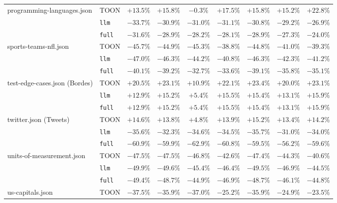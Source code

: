\begin{table}[t]
\begin{tabular}{@{}llccccccc@{}}
    \cline{2-9}
    \multirow{3}{*}{programming-languages.json} & TOON & $+13.5\%$ & $+15.8\%$ & $-0.3\%$ & $+17.5\%$ & $+15.8\%$ & $+15.2\%$ & $+22.8\%$ \\
     & \texttt{llm} & $-33.7\%$ & $-30.9\%$ & $-31.0\%$ & $-31.1\%$ & $-30.8\%$ & $-29.2\%$ & $-26.9\%$ \\
     & \texttt{full} & $-31.6\%$ & $-28.9\%$ & $-28.2\%$ & $-28.1\%$ & $-28.9\%$ & $-27.3\%$ & $-24.0\%$ \\
    \cline{2-9}
    \multirow{3}{*}{sports-teams-nfl.json} & TOON & $-45.7\%$ & $-44.9\%$ & $-45.3\%$ & $-38.8\%$ & $-44.8\%$ & $-41.0\%$ & $-39.3\%$ \\
     & \texttt{llm} & $-47.0\%$ & $-46.3\%$ & $-44.2\%$ & $-40.8\%$ & $-46.3\%$ & $-42.3\%$ & $-41.2\%$ \\
     & \texttt{full} & $-40.1\%$ & $-39.2\%$ & $-32.7\%$ & $-33.6\%$ & $-39.1\%$ & $-35.8\%$ & $-35.1\%$ \\
    \cline{2-9}
    \multirow{3}{*}{test-edge-cases.json (Bordes)} & TOON & $+20.5\%$ & $+23.1\%$ & $+10.9\%$ & $+22.1\%$ & $+23.4\%$ & $+20.0\%$ & $+23.1\%$ \\
     & \texttt{llm} & $+12.9\%$ & $+15.2\%$ & $+5.4\%$ & $+15.5\%$ & $+15.4\%$ & $+13.1\%$ & $+15.9\%$ \\
     & \texttt{full} & $+12.9\%$ & $+15.2\%$ & $+5.4\%$ & $+15.5\%$ & $+15.4\%$ & $+13.1\%$ & $+15.9\%$ \\
    \cline{2-9}
    \multirow{3}{*}{twitter.json (Tweets)} & TOON & $+14.6\%$ & $+13.8\%$ & $+4.8\%$ & $+13.9\%$ & $+15.2\%$ & $+13.4\%$ & $+14.2\%$ \\
     & \texttt{llm} & $-35.6\%$ & $-32.3\%$ & $-34.6\%$ & $-34.5\%$ & $-35.7\%$ & $-31.0\%$ & $-34.0\%$ \\
     & \texttt{full} & $-60.9\%$ & $-59.9\%$ & $-62.9\%$ & $-60.8\%$ & $-59.5\%$ & $-56.2\%$ & $-59.6\%$ \\
    \cline{2-9}
    \multirow{3}{*}{units-of-measurement.json} & TOON & $-47.5\%$ & $-47.5\%$ & $-46.8\%$ & $-42.6\%$ & $-47.4\%$ & $-44.3\%$ & $-40.6\%$ \\
     & \texttt{llm} & $-49.9\%$ & $-49.6\%$ & $-45.4\%$ & $-46.4\%$ & $-49.5\%$ & $-46.9\%$ & $-44.5\%$ \\
     & \texttt{full} & $-49.4\%$ & $-48.7\%$ & $-44.9\%$ & $-46.9\%$ & $-48.7\%$ & $-46.1\%$ & $-44.8\%$ \\
    \cline{2-9}
    \multirow{3}{*}{us-capitals.json} & TOON & $-37.5\%$ & $-35.9\%$ & $-37.0\%$ & $-25.2\%$ & $-35.9\%$ & $-24.9\%$ & $-23.5\%$ \\

\end{tabular}
\end{table}
